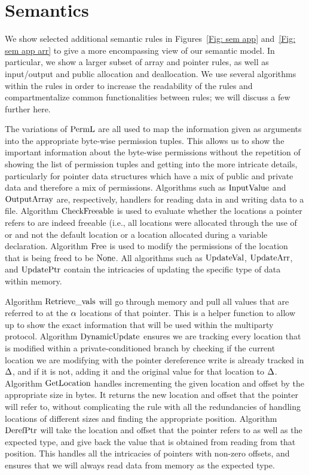 \section{Semantics}
\label{app: semantics}

We show selected additional semantic rules in Figures~\ref{Fig: sem app} and~\ref{Fig: sem app arr} to give a more encompassing view of our semantic model.
In particular, we show a larger subset of array and pointer rules, as well as input/output and public allocation and deallocation. 
We use several algorithms within the rules in order to increase the readability of the rules and compartmentalize common functionalities between rules; we will discuss a few further here. 

The variations of $\mathrm{PermL}$ are all used to map the information given as arguments into the appropriate byte-wise permission tuples. This allows us to show the important information about the byte-wise permissions without the repetition of showing the list of permission tuples and getting into the more intricate details, particularly for pointer data structures which have a mix of public and private data and therefore a mix of permissions. 
Algorithms such as $\mathrm{InputValue}$ and $\mathrm{OutputArray}$ are, respectively, handlers for reading data in and writing data to a file. 
Algorithm $\mathrm{CheckFreeable}$ is used to evaluate whether the locations a pointer refers to are indeed freeable (i.e., all locations were allocated through the use of  or  and not the default location or a location allocated during a variable declaration. 
Algorithm $\mathrm{Free}$ is used to modify the permissions of the location that is being freed to be $\mathrm{None}$. 
All algorithms such as $\mathrm{UpdateVal}$, $\mathrm{UpdateArr}$, and $\mathrm{UpdatePtr}$ contain the intricacies of updating the specific type of data within memory. 

Algorithm $\mathrm{Retrieve\_vals}$ will go through memory and pull all values that are referred to at the $\alpha$ locations of that pointer. This is a helper function to allow up to show the exact information that will be used within the multiparty protocol. 
Algorithm $\mathrm{DynamicUpdate}$ ensures we are tracking every location that is modified within a private-conditioned branch by checking if the current location we are modifying with the pointer dereference write is already tracked in $\Delta$, and if it is not, adding it and the original value for that location to $\Delta$. 
Algorithm $\mathrm{GetLocation}$ handles incrementing the given location and offset by the appropriate size in bytes. It returns the new location and offset that the pointer will refer to, without complicating the rule with all the redundancies of handling locations of different sizes and finding the appropriate position. 
Algorithm $\mathrm{DerefPtr}$ will take the location and offset that the pointer refers to as well as the expected type, and give back the value that is obtained from reading from that position. This handles all the intricacies of pointers with non-zero offsets, and ensures that we will always read data from memory as the expected type. 

